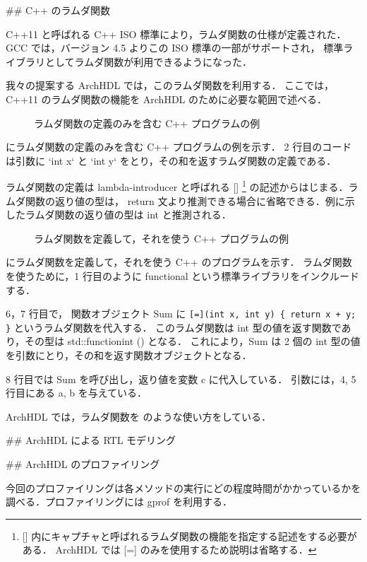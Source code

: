 
## C++ のラムダ関数

C++11 と呼ばれる C++ ISO 標準により，ラムダ関数の仕様が定義された．
GCC では，バージョン 4.5 よりこの ISO 標準の一部がサポートされ，
標準ライブラリとしてラムダ関数が利用できるようになった．

我々の提案する ArchHDL では，このラムダ関数を利用する．
ここでは，C++11 のラムダ関数の機能を ArchHDL のために必要な範囲で述べる．

\begin{figure}[t]
 
 \caption{ラムダ関数の定義のみを含む C++ プログラムの例}
 \label{src:def_lambda}
\end{figure}

 にラムダ関数の定義のみを含む C++ プログラムの例を示す．
2 行目のコードは引数に `int x` と `int y` をとり，その和を返すラムダ関数の定義である．

ラムダ関数の定義は lambda-introducer と呼ばれる [] \footnote{
[] 内にキャプチャと呼ばれるラムダ関数の機能を指定する記述をする必要がある．
ArchHDL では [=] のみを使用するため説明は省略する．
}
の記述からはじまる．ラムダ関数の返り値の型は，
return 文より推測できる場合に省略できる．例に示したラムダ関数の返り値の型は
int と推測される．

\begin{figure}[t]
 
 \caption{ラムダ関数を定義して，それを使う C++ プログラムの例}
 \label{src:ex_lambda}
\end{figure}

 にラムダ関数を定義して，それを使う C++ のプログラムを示す．
ラムダ関数を使うために，1 行目のように functional という標準ライブラリをインクルードする．

6，7 行目で， 関数オブジェクト Sum に
\verb`[=](int x, int y) { return x + y; }`
というラムダ関数を代入する．
このラムダ関数は int 型の値を返す関数であり，その型は std::function\<int ()\> となる．
これにより，Sum は 2 個の int 型の値を引数にとり，その和を返す関数オブジェクトとなる．

8 行目では Sum を呼び出し，返り値を変数 c に代入している．
引数には，4, 5 行目にある a, b を与えている．

ArchHDL では，ラムダ関数を  のような使い方をしている．

\fi

## ArchHDL による RTL モデリング



## ArchHDL のプロファイリング \label{ss:profiling}

今回のプロファイリングは各メソッドの実行にどの程度時間がかかっているかを調べる．プロファイリングには
gprof を利用する．


